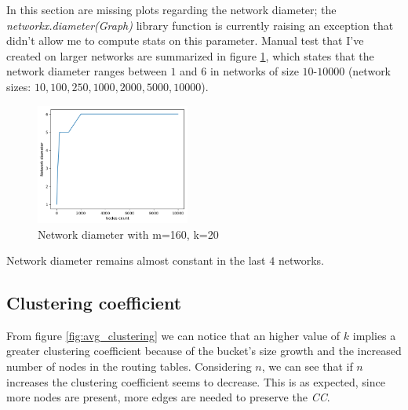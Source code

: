 \documentclass[12pt]{article}
\begin{document}
\pagebreak

\noindent
In this section are missing plots regarding the network diameter; the \textit{networkx.diameter(Graph)} library function is currently raising an exception that didn't allow me to compute stats on this parameter. Manual test that I've created on larger networks are summarized in figure \ref{fig:avg_diameter}, which states that the network diameter ranges between $1$ and $6$ in networks of size $10$-$10000$ (network sizes: $10,100,250,1000,2000,5000,10000$). 

\begin{figure}[H]
    \centering
    \includegraphics[width=0.45\textwidth]{assets/diameter_m160_k20.png} 
    \caption{Network diameter with m=160, k=20}
    \label{fig:avg_diameter}
\end{figure}

Network diameter remains almost constant in the last $4$ networks.


\pagebreak

\subsection{Clustering coefficient}

From figure \ref{fig:avg_clustering} we can notice that an higher value of $k$ implies a greater clustering coefficient because of the bucket's size growth and the increased number of nodes in the routing tables.
Considering $n$, we can see that if $n$ increases the clustering coefficient seems to decrease. This is as expected, since more nodes are present, more edges are needed to preserve the \textit{CC}.
\end{document}
